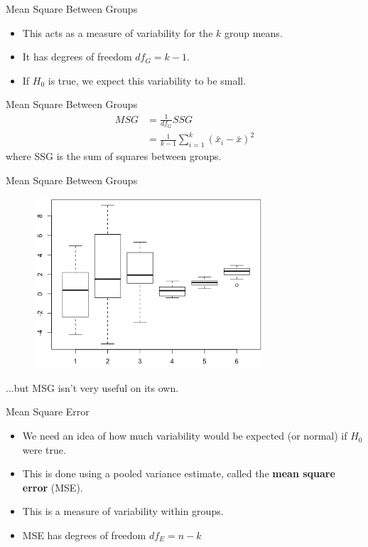 \begin{frame}{Mean Square Between Groups}
    \begin{itemize}
        \item This acts as a measure of variability for the $k$ group means.
        \item It has degrees of freedom $df_G = k-1$.
        \item If $H_0$ is true, we expect this variability to be small.
    \end{itemize}
\end{frame}

\begin{frame}{Mean Square Between Groups}
    \begin{align*}
        MSG &= \frac{1}{df_G}SSG \\
        &= \frac{1}{k-1}\sum_{i=1}^{k}(\bar{x}_i - \bar{x})^2
    \end{align*}
    where SSG is the sum of squares between groups.
\end{frame}

\begin{frame}{Mean Square Between Groups}
    \begin{figure}
        \centering
        \includegraphics[height=2.5in]{images/bothvar.png}
    \end{figure}
    ...but MSG isn't very useful on its own.
\end{frame}

\begin{frame}{Mean Square Error}
    \begin{itemize}
        \item We need an idea of how much variability would be expected (or normal) if $H_0$ were true.
        \item This is done using a pooled variance estimate, called the \textbf{mean square error} (MSE).
        \item This is a measure of variability within groups.
        \item MSE has degrees of freedom $df_E = n-k$
    \end{itemize}
\end{frame}

